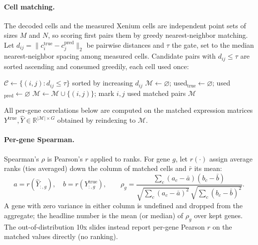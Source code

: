 \documentclass[11pt]{article}
\begin{document}
\paragraph{Cell matching.} The decoded cells and the measured Xenium cells are
independent point sets of sizes $M$ and $N$, so scoring first pairs them by
greedy nearest-neighbor matching. Let $d_{ij}=\lVert c^{\mathrm{true}}_i-
c^{\mathrm{pred}}_j\rVert_2$ be pairwise distances and $\tau$ the gate, set to the
median nearest-neighbor spacing among measured cells. Candidate pairs with
$d_{ij}\le\tau$ are sorted ascending and consumed greedily, each cell used once:
\begin{algorithm}[!htbp]
\caption{Greedy one-to-one cell matching}
\begin{algorithmic}[1]
\State $\mathcal{C}\gets\{(i,j): d_{ij}\le\tau\}$ sorted by increasing $d_{ij}$
\State $\mathcal{M}\gets\varnothing$;\; used$_{\mathrm{true}}\gets\varnothing$;\; used$_{\mathrm{pred}}\gets\varnothing$
    \State $\mathcal{M}\gets\mathcal{M}\cup\{(i,j)\}$;\; mark $i,j$ used
  \EndIf
\EndFor
\State \Return matched pairs $\mathcal{M}$ 
\end{algorithmic}
\end{algorithm}
All per-gene correlations below are computed on the matched expression matrices
$Y^{\mathrm{true}},\hat Y\in\mathbb{R}^{|\mathcal{M}|\times G}$ obtained by
reindexing to $\mathcal{M}$.

\paragraph{Per-gene Spearman.} Spearman's $\rho$ is Pearson's $r$ applied to
ranks. For gene $g$, let $r(\cdot)$ assign average ranks (ties averaged) down the
column of matched cells and $\bar r$ its mean:
\[
a=r\!\left(\hat Y_{:,g}\right),\quad b=r\!\left(Y^{\mathrm{true}}_{:,g}\right),
\qquad
\rho_g=\frac{\sum_c (a_c-\bar a)(b_c-\bar b)}
{\sqrt{\sum_c (a_c-\bar a)^2}\,\sqrt{\sum_c (b_c-\bar b)^2}} .
\]
A gene with zero variance in either column is undefined and dropped from the
aggregate; the headline number is the mean (or median) of $\rho_g$ over kept
genes. The out-of-distribution 10x slides instead report per-gene Pearson $r$ on
the matched values directly (no ranking).
\end{document}
